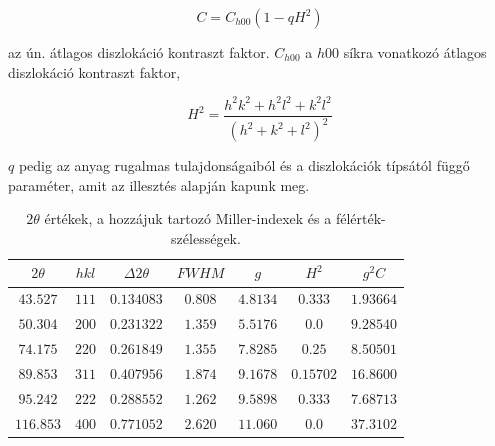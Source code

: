 \documentclass[12pt]{article}
\theoremstyle{plain}
\begin{document}
\begin{equation*}
	C = C_{h00}(1-qH^2)
\end{equation*}

\vspace{.2cm}

\par az ún. átlagos diszlokáció kontraszt faktor. $C_{h00}$ a $h00$ síkra vonatkozó átlagos diszlokáció kontraszt faktor,

\vspace{.2cm}

\begin{equation*}
	H^2 = \frac{h^2k^2 + h^2l^2 + k^2l^2}{(h^2+k^2+l^2)^2}
\end{equation*}

\vspace{.2cm}

\par $q$ pedig az anyag rugalmas tulajdonságaiból és a diszlokációk típsától függő paraméter, amit az illesztés alapján kapunk meg.

\vspace{.2cm}

\begin{table}[H]
	\begin{center}
		\begin{tabular}{|c|c|c|c|c|c|c|} \hline
			$2\theta$ & $hkl$ & $\Delta 2\theta$ & $FWHM$  & $g$      & $H^2$     & $g^2 C$   \\ \hline
			$43.527$  & $111$ & $0.134083$       & $0.808$ & $4.8134$ & $0.333$   & $1.93664$ \\ \hline
			$50.304$  & $200$ & $0.231322$       & $1.359$ & $5.5176$ & $0.0$     & $9.28540$ \\ \hline
			$74.175$  & $220$ & $0.261849$       & $1.355$ & $7.8285$ & $0.25$    & $8.50501$ \\ \hline
			$89.853$  & $311$ & $0.407956$       & $1.874$ & $9.1678$ & $0.15702$ & $16.8600$ \\ \hline
			$95.242$  & $222$ & $0.288552$       & $1.262$ & $9.5898$ & $0.333$   & $7.68713$ \\ \hline
			$116.853$ & $400$ & $0.771052$       & $2.620$ & $11.060$ & $0.0$     & $37.3102$ \\ \hline
		\end{tabular}
		\caption{ $2\theta$ értékek, a hozzájuk tartozó Miller-indexek és a félérték-szélességek.}
	\end{center}
	\label{table:fwhm}
\end{table}
\end{document}
